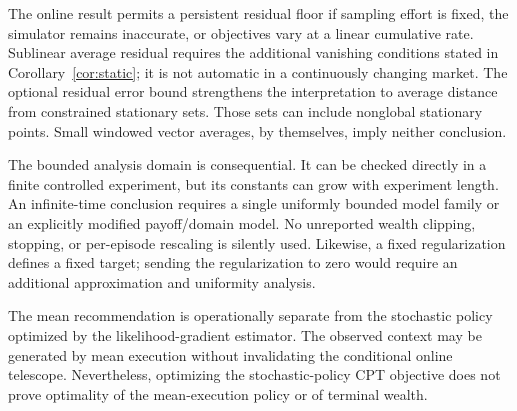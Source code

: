 \documentclass[11pt]{article}
\newcommand{\1}{\mathbf 1}
\theoremstyle{definition}
\begin{document}
The online result permits a persistent residual floor if sampling effort is fixed, the simulator remains inaccurate, or objectives vary at a linear cumulative rate. Sublinear average residual requires the additional vanishing conditions stated in Corollary~\ref{cor:static}; it is not automatic in a continuously changing market. The optional residual error bound strengthens the interpretation to average distance from constrained stationary sets. Those sets can include nonglobal stationary points. Small windowed vector averages, by themselves, imply neither conclusion.

The bounded analysis domain is consequential. It can be checked directly in a finite controlled experiment, but its constants can grow with experiment length. An infinite-time conclusion requires a single uniformly bounded model family or an explicitly modified payoff/domain model. No unreported wealth clipping, stopping, or per-episode rescaling is silently used. Likewise, a fixed regularization defines a fixed target; sending the regularization to zero would require an additional approximation and uniformity analysis.

The mean recommendation is operationally separate from the stochastic policy optimized by the likelihood-gradient estimator. The observed context may be generated by mean execution without invalidating the conditional online telescope. Nevertheless, optimizing the stochastic-policy CPT objective does not prove optimality of the mean-execution policy or of terminal wealth.
\end{document}
